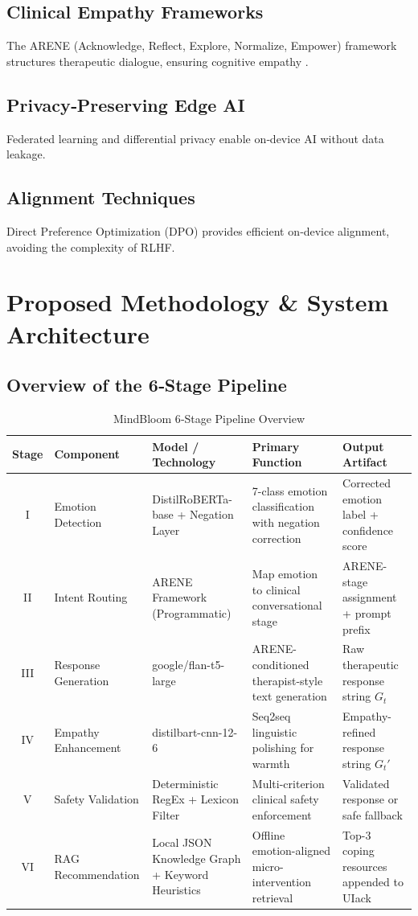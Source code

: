 \documentclass[12pt,twoside]{article}
\begin{document}
\subsection{Clinical Empathy Frameworks}
The ARENE (Acknowledge, Reflect, Explore, Normalize, Empower) framework structures therapeutic dialogue, ensuring cognitive empathy \citep{chung2022flan}.

\subsection{Privacy‑Preserving Edge AI}
Federated learning \citep{mcmahan2017fedavg} and differential privacy \citep{dwork2006differential} enable on‑device AI without data leakage.

\subsection{Alignment Techniques}
Direct Preference Optimization (DPO) \citep{rafailov2023dpo} provides efficient on‑device alignment, avoiding the complexity of RLHF.

\section{Proposed Methodology \& System Architecture}
\subsection{Overview of the 6‑Stage Pipeline}
\begin{table}[H]
\centering
\caption{MindBloom 6‑Stage Pipeline Overview}
\begin{tabular}{|c|p{3.2cm}|p{3.8cm}|p{5.0cm}|p{5.0cm}|}
\hline
\rowcolor{gray!20}
\textbf{Stage} & \textbf{Component} & \textbf{Model / Technology} & \textbf{Primary Function} & \textbf{Output Artifact} \\
\hline
I & Emotion Detection & DistilRoBERTa-base + Negation Layer & 7-class emotion classification with negation correction & Corrected emotion label + confidence score \\
\hline
II & Intent Routing & ARENE Framework (Programmatic) & Map emotion to clinical conversational stage & ARENE-stage assignment + prompt prefix \\
\hline
III & Response Generation & google/flan-t5-large & ARENE-conditioned therapist-style text generation & Raw therapeutic response string $G_t$ \\
\hline
IV & Empathy Enhancement & distilbart-cnn-12-6 & Seq2seq linguistic polishing for warmth & Empathy-refined response string $G_t'$ \\
\hline
V & Safety Validation & Deterministic RegEx + Lexicon Filter & Multi-criterion clinical safety enforcement & Validated response or safe fallback \\
\hline
VI & RAG Recommendation & Local JSON Knowledge Graph + Keyword Heuristics & Offline emotion-aligned micro-intervention retrieval & Top-3 coping resources appended to UIack \\
\hline
\end{tabular}
\label{tab:pipeline_overview}
\end{table}
\end{document}
